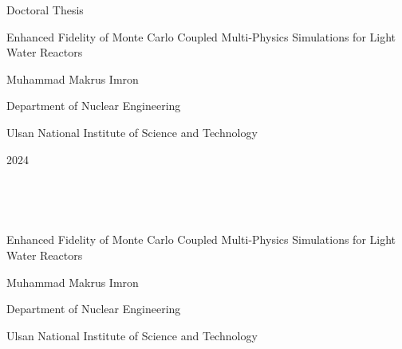 \documentclass[11pt,a4paper,onecolumn,oneside]{report}
\begin{document}


\begin{center}
\LARGE Doctoral Thesis

\vspace{3cm}
\huge Enhanced Fidelity of Monte Carlo Coupled Multi-Physics Simulations for Light Water Reactors

\vfill

\LARGE Muhammad Makrus Imron

\vspace{2cm}

\LARGE Department of Nuclear Engineering 

\vspace{2cm}

\LARGE Ulsan National Institute of Science and Technology
\vspace{2cm}

\LARGE 2024

\end{center}
\thispagestyle{empty}
\clearpage

\begin{center}
\hbox{ }

\hbox{ }

\huge Enhanced Fidelity of Monte Carlo Coupled Multi-Physics Simulations for Light Water Reactors 

\vspace{5cm}

\LARGE Muhammad Makrus Imron

\vspace{6cm}

\LARGE Department of Nuclear Engineering 

\vspace{2cm}

\LARGE Ulsan National Institute of Science and Technology

\end{center}
\thispagestyle{empty}
\clearpage

\end{document}
